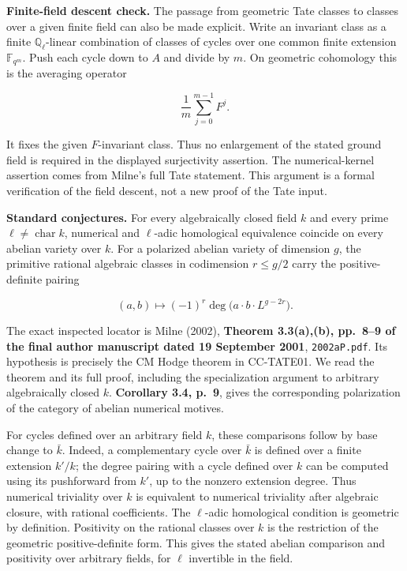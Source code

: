 \documentclass[11pt,a4paper]{article}
\theoremstyle{definition}\newtheorem{definition}[theorem]{Definition}
\theoremstyle{remark}\newtheorem{remark}[theorem]{Remark}
\begin{document}
\textbf{Finite-field descent check.} The passage from geometric Tate
classes to classes over a given finite field can also be made explicit.
Write an invariant class as a finite \(\mathbb Q_\ell\)-linear
combination of classes of cycles over one common finite extension
\(\mathbb F_{q^m}\). Push each cycle down to \(A\) and divide by \(m\).
On geometric cohomology this is the averaging operator

\[
\frac1m\sum_{j=0}^{m-1}F^j.
\]

It fixes the given \(F\)-invariant class. Thus no enlargement of the
stated ground field is required in the displayed surjectivity assertion.
The numerical-kernel assertion comes from Milne's full Tate statement.
This argument is a formal verification of the field descent, not a new
proof of the Tate input.

\textbf{Standard conjectures.} For every algebraically closed field
\(k\) and every prime \(\ell\ne\operatorname{char}k\), numerical and
\(\ell\)-adic homological equivalence coincide on every abelian variety
over \(k\). For a polarized abelian variety of dimension \(g\), the
primitive rational algebraic classes in codimension \(r\le g/2\) carry
the positive-definite pairing

\[
(a,b)\longmapsto(-1)^r\deg\bigl(a\cdot b\cdot L^{g-2r}\bigr).
\]

The exact inspected locator is Milne (2002), \textbf{Theorem 3.3(a),(b),
pp.~8--9 of the final author manuscript dated 19 September 2001},
\nolinkurl{2002aP.pdf}. Its hypothesis is precisely the CM Hodge theorem in
CC-TATE01. We read the theorem and its full proof, including the
specialization argument to arbitrary algebraically closed \(k\).
\textbf{Corollary 3.4, p.~9}, gives the corresponding polarization of
the category of abelian numerical motives.

For cycles defined over an arbitrary field \(k\), these comparisons
follow by base change to \(\bar k\). Indeed, a complementary cycle over
\(\bar k\) is defined over a finite extension \(k'/k\); the degree
pairing with a cycle defined over \(k\) can be computed using its
pushforward from \(k'\), up to the nonzero extension degree. Thus
numerical triviality over \(k\) is equivalent to numerical triviality
after algebraic closure, with rational coefficients. The \(\ell\)-adic
homological condition is geometric by definition. Positivity on the
rational classes over \(k\) is the restriction of the geometric
positive-definite form. This gives the stated abelian comparison and
positivity over arbitrary fields, for \(\ell\) invertible in the field.
\end{document}
